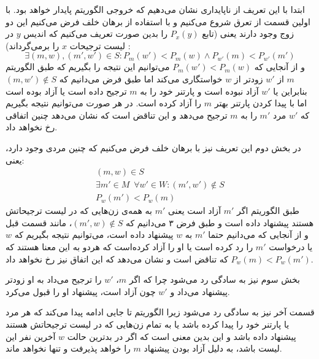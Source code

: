 \documentclass[]{article}
\begin{document}
ابتدا با این تعریف از ناپایداری نشان می‌دهیم که خروجی الگوریتم پایدار خواهد بود.
با اولین قسمت از تعرق شروع می‌کنیم و با استفاده از برهان خلف فرض می‌کنیم این دو زوج وجود دارند یعنی
(تابع $P_x(y)$ را بدین صورت تعریف می‌کنیم که اندیس $y$ در لیست ترجیحات $x$ را برمی‌گرداند) :
\begin{equation}
    \exists (m, w), (m', w') \in S : P_m(w') < P_m(w) \land P_{w'}(m) < P_{w'}(m')
\end{equation}
و از آنجایی که $P_m(w') < P_m(w)$
می‌توانیم این نتیجه را بگیریم که طبق الگوریتم $m$ از $w'$ زودتر از $w$ خواستگاری می‌کند
اما طبق فرض می‌دانیم که $(m, w') \not \in S$  بنابراین یا $w'$ آزاد نبوده است و پارتنر خود را
به $m$ ترجیح داده است یا آزاد بوده است اما با پیدا کردن پارتنر بهتر $m$ را آزاد کرده است.
در هر صورت می‌توانیم نتیجه بگیریم که $w'$ مرد $m'$ را به $m$ ترجیح می‌دهد و این تناقض است
که نشان می‌دهد چنین اتفاقی رخ نخواهد داد.

در بخش دوم این تعریف نیز با برهان خلف فرض می‌کنیم که چنین مردی وجود دارد، یعنی:
\begin{align}
    (m, w) \in S \\
    \exists m' \in M \; \: \forall w' \in W: (m', w') \not \in S \\
    P_w(m') < P_w(m)
\end{align}
طبق الگوریتم اگر $m'$ آزاد است یعنی $m'$ به همه‌ی زن‌هایی که در لیست ترجیحاتش
هستند پیشنهاد داده است و طبق فرض ۳ می‌دانیم که $(m', w) \not \in S$،
مانند قسمت قبل و از آنجایی که می‌دانیم حتما $m'$ به $w$ پیشنهاد داده است،
می‌توانیم نتیجه بگیریم که $w$ یا درخواست $m'$ را رد کرده است یا او را آزاد کرده‌است
که هردو به این معنا هستند که $P_w(m) < P_w(m')$ که تناقض است و نشان می‌دهد که این اتفاق نیز رخ نخواهد داد.

بخش سوم نیز به سادگی رد می‌شود چرا که اگر $m$، $w'$ را ترجیح می‌داد به او زودتر پیشنهاد می‌داد
و $w'$ چون آزاد است، پیشنهاد او را قبول می‌کرد.

قسمت آخر نیز به سادگی رد می‌شود زیرا الگوریتم تا جایی ادامه پیدا می‌کند که هر مرد یا پارتنر خود را پیدا کرده باشد
یا به تمام زن‌هایی که در لیست ترجیحاتش هستند پیشنهاد داده باشد و این بدین معنی است که اگر
در بدترین حالت $w$ آخرین نفر این لیست باشد، به دلیل آزاد بودن پیشنهاد $m$ را خواهد پذیرفت و تنها نخواهد ماند.
\end{document}
